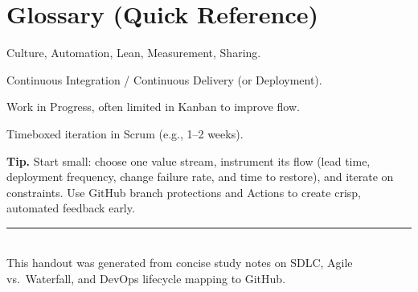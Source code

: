 \documentclass[11pt]{article}
\newcommand{\gh}{GitHub}
\begin{document}
\section*{Glossary (Quick Reference)}
\begin{description}[leftmargin=1.5em]
  \item[CALMS] Culture, Automation, Lean, Measurement, Sharing.
  \item[CI/CD] Continuous Integration / Continuous Delivery (or Deployment).
  \item[WIP] Work in Progress, often limited in Kanban to improve flow.
  \item[Sprint] Timeboxed iteration in Scrum (e.g., 1--2 weeks).
\end{description}

\begin{note}
\textbf{Tip.} Start small: choose one value stream, instrument its flow (lead time, deployment frequency, change failure rate, and time to restore), and iterate on constraints. Use \gh{} branch protections and Actions to create crisp, automated feedback early.
\end{note}

\vfill
\noindent\rule{\linewidth}{0.4pt}\\
{\footnotesize This handout was generated from concise study notes on SDLC, Agile vs.\ Waterfall, and DevOps lifecycle mapping to \gh{}.}
\end{document}
